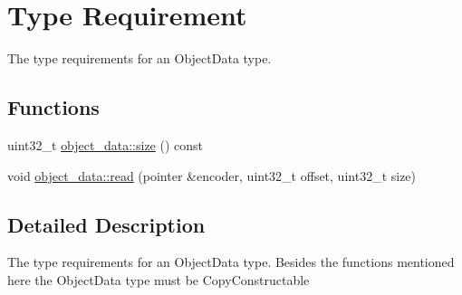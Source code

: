 \hypertarget{group__object__data__type}{\section{Type Requirement}
\label{group__object__data__type}
}


The type requirements for an Object\-Data type.  


\subsection*{Functions}
\begin{DoxyCompactItemize}
\item 
uint32\-\_\-t \hyperlink{group__object__data__type_gafcccd13382edeea01629744f28f86984}{object\-\_\-data\-::size} () const 
\item 
void \hyperlink{group__object__data__type_ga70e0d8af81b20eb6b4e9818efd2c1502}{object\-\_\-data\-::read} (pointer \&encoder, uint32\-\_\-t offset, uint32\-\_\-t size)
\end{DoxyCompactItemize}


\subsection{Detailed Description}
The type requirements for an Object\-Data type. Besides the functions mentioned here the Object\-Data type must be Copy\-Constructable 

